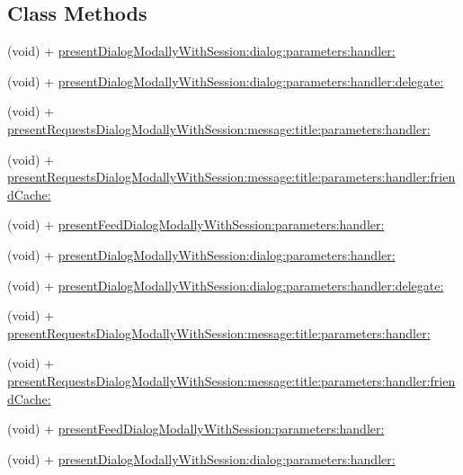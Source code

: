 \subsection*{Class Methods}
\begin{DoxyCompactItemize}
\item 
(void) + \hyperlink{interfaceFBWebDialogs_aa4d2e1b0b7a49ea3d08964a09a20ec63}{present\+Dialog\+Modally\+With\+Session\+:dialog\+:parameters\+:handler\+:}
\item 
(void) + \hyperlink{interfaceFBWebDialogs_a8be8194bef8e87199f915373776e122f}{present\+Dialog\+Modally\+With\+Session\+:dialog\+:parameters\+:handler\+:delegate\+:}
\item 
(void) + \hyperlink{interfaceFBWebDialogs_abea4b28e51126b41381c83cac5aa6a1c}{present\+Requests\+Dialog\+Modally\+With\+Session\+:message\+:title\+:parameters\+:handler\+:}
\item 
(void) + \hyperlink{interfaceFBWebDialogs_a50539709ca0985ee356cfa23b2eb2903}{present\+Requests\+Dialog\+Modally\+With\+Session\+:message\+:title\+:parameters\+:handler\+:friend\+Cache\+:}
\item 
(void) + \hyperlink{interfaceFBWebDialogs_a040eaa8259068aa3035ee5aa803a1271}{present\+Feed\+Dialog\+Modally\+With\+Session\+:parameters\+:handler\+:}
\item 
(void) + \hyperlink{interfaceFBWebDialogs_aa4d2e1b0b7a49ea3d08964a09a20ec63}{present\+Dialog\+Modally\+With\+Session\+:dialog\+:parameters\+:handler\+:}
\item 
(void) + \hyperlink{interfaceFBWebDialogs_a8be8194bef8e87199f915373776e122f}{present\+Dialog\+Modally\+With\+Session\+:dialog\+:parameters\+:handler\+:delegate\+:}
\item 
(void) + \hyperlink{interfaceFBWebDialogs_abea4b28e51126b41381c83cac5aa6a1c}{present\+Requests\+Dialog\+Modally\+With\+Session\+:message\+:title\+:parameters\+:handler\+:}
\item 
(void) + \hyperlink{interfaceFBWebDialogs_a50539709ca0985ee356cfa23b2eb2903}{present\+Requests\+Dialog\+Modally\+With\+Session\+:message\+:title\+:parameters\+:handler\+:friend\+Cache\+:}
\item 
(void) + \hyperlink{interfaceFBWebDialogs_a040eaa8259068aa3035ee5aa803a1271}{present\+Feed\+Dialog\+Modally\+With\+Session\+:parameters\+:handler\+:}
\item 
(void) + \hyperlink{interfaceFBWebDialogs_aa4d2e1b0b7a49ea3d08964a09a20ec63}{present\+Dialog\+Modally\+With\+Session\+:dialog\+:parameters\+:handler\+:}
\item 

\end{DoxyCompactItemize}
